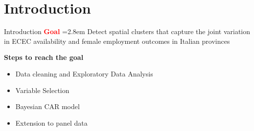 \section{Introduction} %
\begin{frame}{Introduction} %
\vspace{0.5 cm}
\noindent
\textbf{\textcolor{red}{Goal}}\hspace{0.5em}%
\hangindent=2.8em
Detect spatial clusters that capture the joint variation in ECEC 
availability and female employment outcomes in Italian provinces

\vspace{0.8 cm}

\textbf{Steps to reach the goal}
\begin{itemize}
    \item Data cleaning and Exploratory Data Analysis
    \item Variable Selection
    \item Bayesian CAR model
    \item Extension to panel data
\end{itemize}
    
\end{frame}